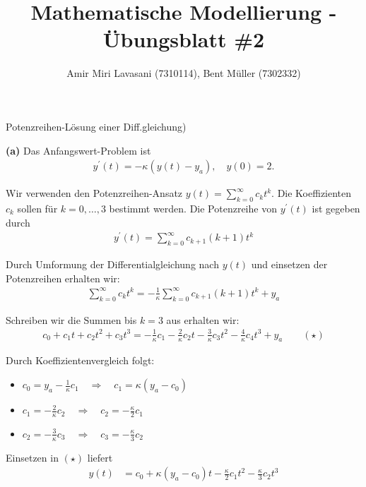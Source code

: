 \documentclass[10pt]{article}
\newenvironment{Aufgabe}[2][Aufgabe]{\begin{trivlist}
\item[\hskip \labelsep {\bfseries #1}\hskip \labelsep {\bfseries #2.}]}{\end{trivlist}}
\begin{document}
 
\title{ \textbf{Mathematische Modellierung - Übungsblatt \#2} }

\author{Amir Miri Lavasani (7310114), Bent Müller (7302332)} \maketitle

 
\begin{Aufgabe}{4}
    (Potenzreihen-Lösung einer Diff.gleichung)
\end{Aufgabe}

\textbf{(a)} Das Anfangswert-Problem ist 
  \begin{align*}
    y^\prime(t) = -\kappa(y(t) - y_a), \quad y(0) = 2.
  \end{align*}
  
  Wir verwenden den Potenzreihen-Ansatz $y(t) = \sum_{k=0}^{\infty} c_k t^k$. Die Koeffizienten $c_k$ sollen 
  für $k=0,\dots,3$ bestimmt werden. Die Potenzreihe von $y^\prime(t)$ ist gegeben durch 
  \begin{align*}
    y^\prime(t) = \sum_{k=0}^{\infty} c_{k+1}(k+1) t^k
  \end{align*}

  Durch Umformung der Differentialgleichung nach $y(t)$ und einsetzen der Potenzreihen erhalten wir:
  \begin{align*}
    \sum_{k=0}^{\infty} c_k t^k = -\frac{1}{\kappa} \sum_{k=0}^{\infty} c_{k+1}(k+1) t^k + y_a
  \end{align*}

  Schreiben wir die Summen bis $k=3$ aus erhalten wir:
  \begin{align*}
    c_0 + c_1t + c_2t^2 + c_3t^3 = -\frac{1}{\kappa}c_1 - \frac{2}{\kappa}c_2t 
                                   - \frac{3}{\kappa}c_3t^2 - \frac{4}{\kappa}c_4t^3 + y_a  \qquad(\star)
  \end{align*}

  Durch Koeffizientenvergleich folgt:
  \begin{itemize}
    \item[-] $c_0 = y_a - \frac{1}{\kappa}c_1 \quad\Rightarrow\quad c_1 = \kappa(y_a - c_0)$
    \item[-] $c_1 = -\frac{2}{\kappa}c_2 \quad\Rightarrow\quad c_2 = -\frac{\kappa}{2} c_1$
    \item[-] $c_2 = -\frac{3}{\kappa} c_3 \quad\Rightarrow\quad c_3 = -\frac{\kappa}{3}c_2$ 
  \end{itemize}

  Einsetzen in $(\star)$ liefert
  \begin{align*}
    y(t) &= c_0 + \kappa(y_a - c_0) t - \frac{\kappa}{2} c_1 t^2 - \frac{\kappa}{3}c_2 t^3 \\
  \end{align*}
\end{document}
